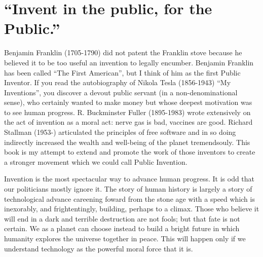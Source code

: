 \documentclass[
	fontsize=10pt, %
	twoside=false, %
	secnumdepth=1, %
]{kaobook}
\begin{document}
\let\cleardoublepage\bigskip
\let\clearpage\bigskip

\listoftables %

\endgroup


\mainmatter %


\chapter{“Invent in the public, for the Public.”}


Benjamin Franklin (1705-1790) did not patent the Franklin stove because
he believed it to be too useful an invention to legally encumber.
Benjamin Franklin has been
called ``The First American''\cite{Brands2000}, but I think of him as the
first Public Inventor.
If you read the autobiography of Nikola Tesla (1856-1943)
``My Inventions''\cite{Tesla1982},
you discover a devout public servant
(in a non-denominational sense), who certainly wanted to make
money but whose deepest motivation was to see human progress.
R. Buckminster Fuller (1895-1983) wrote extensively on the act of invention
as a moral act: nerve gas is bad, vaccines are good\cite{Fuller1981}.
Richard Stallman (1953-) articulated the principles of free software
and in so doing indirectly increased the wealth and well-being
of the planet tremendsouly\cite{Stallman2002free}.
This book is my attempt to extend and promote the work of
those inventors to create a stronger movement which we could
call Public Invention.

\nocite{laurel2001}

Invention is the most spectacular way to advance human progress.
It is odd that our politicians mostly ignore it.
The story of human history is largely a story of technological
advance careening foward from the stone age with
a speed which is inexorably, and frightentingly, building,
perhaps to a climax.
Those who believe it will end in a dark and terrible
destruction are not fools;
but that fate is not certain.
We as a planet can choose instead to build a bright future
in which humanity explores the universe together in peace.
This will happen only if we understand technology as the
powerful moral force that it is.
\end{document}
